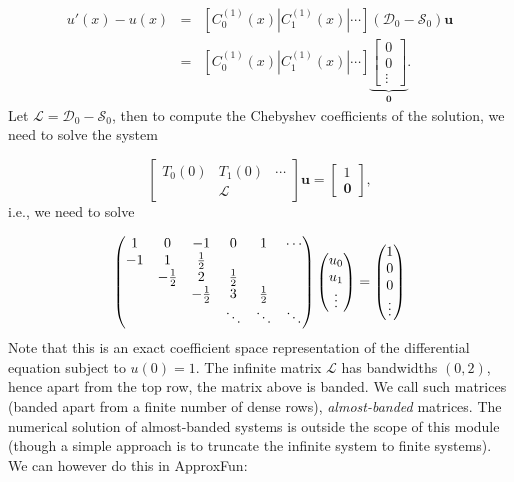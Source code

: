 \documentclass[12pt,a4paper]{article}
\begin{document}
\begin{eqnarray*}
u'(x)-u(x) &=&  \left[ C_0^{(1)}(x) | C_1^{(1)}(x) | \cdots \right]\left(\mathcal{D}_0 - \mathcal{S}_0\right)\mathbf{u}\\
 &=& \left[ C_0^{(1)}(x) | C_1^{(1)}(x) | \cdots \right]\underbrace{\begin{bmatrix} 0 \\ 0 \\ \vdots \end{bmatrix}}_{\mathbf{0}}.
\end{eqnarray*}
Let $\mathcal{L} = \mathcal{D}_0 - \mathcal{S}_0$, then to compute the Chebyshev coefficients of the solution, we need to solve the system

\[
\begin{bmatrix}
T_0(0) & T_1(0) & \cdots  \\
 &\mathcal{L} &
\end{bmatrix}\mathbf{u} = \begin{bmatrix} 1 \\
\mathbf{0}
\end{bmatrix},
\]
i.e., we need to solve

\[
\begin{pmatrix}
      1 & 0 & -1 & 0 & 1 & \cdots \\
    -1 &1 & {1 \over 2} \cr
& -{1 \over 2} & 2 & {1 \over 2} \cr
&& -{1 \over 2} & 3 & {1 \over 2} \cr
&&&\ddots & \ddots & \ddots
\end{pmatrix} \begin{pmatrix} u_0\\u_1\\\vdots \end{pmatrix}  = \begin{pmatrix} 1 \\ 0 \\ 0 \\ \vdots \end{pmatrix}
\]
Note that this is an exact coefficient space representation of the differential equation subject to $u(0) = 1$. The infinite matrix $\mathcal{L}$ has bandwidths $(0,2)$, hence apart from the top row, the matrix above is banded.  We call such matrices (banded apart from a finite number of dense rows), \emph{almost-banded} matrices. The numerical solution of almost-banded systems is outside the scope of this module (though a simple approach is to truncate the infinite system to finite systems). We can however do this in ApproxFun:
\end{document}
